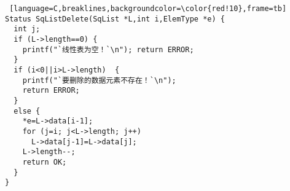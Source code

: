 \begin{lstlisting} [language=C,breaklines,backgroundcolor=\color{red!10},frame=tb]
Status SqListDelete(SqList *L,int i,ElemType *e) {
  int j; 
  if (L->length==0) {
    printf("`线性表为空！`\n"); return ERROR;
  }
  if (i<0||i>L->length)  {
    printf("`要删除的数据元素不存在！`\n"); 
    return ERROR;
  }
  else {
    *e=L->data[i-1];
    for (j=i; j<L->length; j++)
      L->data[j-1]=L->data[j];
    L->length--;
    return OK;
  }
}
\end{lstlisting}
